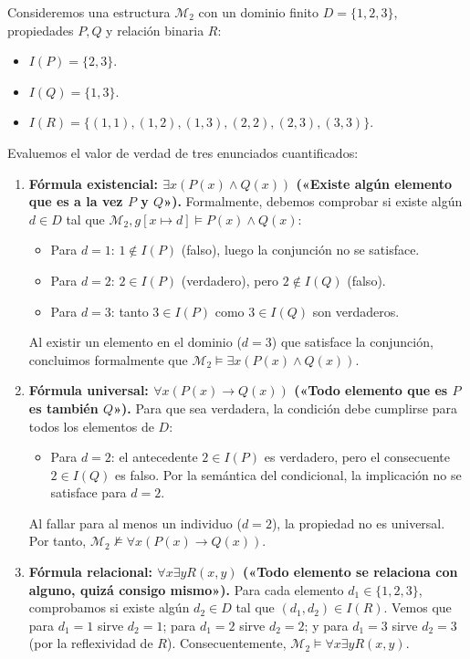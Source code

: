\begin{ejemplo}
Consideremos una estructura $\mathcal{M}_2$ con un dominio finito $D = \{1, 2, 3\}$, propiedades $P, Q$ y relación binaria $R$:
\begin{itemize}
    \item $I(P) = \{2, 3\}$.
    \item $I(Q) = \{1, 3\}$.
    \item $I(R) = \{(1, 1), (1, 2), (1, 3), (2, 2), (2, 3), (3, 3)\}$.
\end{itemize}
Evaluemos el valor de verdad de tres enunciados cuantificados:
\begin{enumerate}
    \item \textbf{Fórmula existencial: $\exists x (P(x) \land Q(x))$ («Existe algún elemento que es a la vez $P$ y $Q$»).}  
    Formalmente, debemos comprobar si existe algún $d \in D$ tal que $\mathcal{M}_2, g[x \mapsto d] \models P(x) \land Q(x)$:
    \begin{itemize}
        \item Para $d = 1$: $1 \notin I(P)$ (falso), luego la conjunción no se satisface.
        \item Para $d = 2$: $2 \in I(P)$ (verdadero), pero $2 \notin I(Q)$ (falso).
        \item Para $d = 3$: tanto $3 \in I(P)$ como $3 \in I(Q)$ son verdaderos.
    \end{itemize}
    Al existir un elemento en el dominio ($d = 3$) que satisface la conjunción, concluimos formalmente que $\mathcal{M}_2 \models \exists x (P(x) \land Q(x))$.
    
    \item \textbf{Fórmula universal: $\forall x (P(x) \to Q(x))$ («Todo elemento que es $P$ es también $Q$»).}  
    Para que sea verdadera, la condición debe cumplirse para todos los elementos de $D$:
    \begin{itemize}
        \item Para $d = 2$: el antecedente $2 \in I(P)$ es verdadero, pero el consecuente $2 \in I(Q)$ es falso. Por la semántica del condicional, la implicación no se satisface para $d = 2$.
    \end{itemize}
    Al fallar para al menos un individuo ($d=2$), la propiedad no es universal. Por tanto, $\mathcal{M}_2 \not\models \forall x (P(x) \to Q(x))$.
    
    \item \textbf{Fórmula relacional: $\forall x \exists y R(x, y)$ («Todo elemento se relaciona con alguno, quizá consigo mismo»).}  
    Para cada elemento $d_1 \in \{1, 2, 3\}$, comprobamos si existe algún $d_2 \in D$ tal que $(d_1, d_2) \in I(R)$. Vemos que para $d_1 = 1$ sirve $d_2 = 1$; para $d_1 = 2$ sirve $d_2 = 2$; y para $d_1 = 3$ sirve $d_2 = 3$ (por la reflexividad de $R$). Consecuentemente, $\mathcal{M}_2 \models \forall x \exists y R(x, y)$.
\end{enumerate}


\end{ejemplo}
